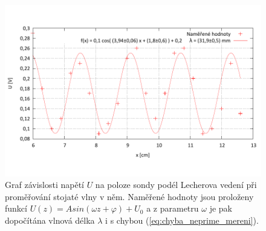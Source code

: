 \documentclass[english]{article}
\begin{document}
	\begin{figure}[h!]
	\begin{center}
	    \vspace*{-1cm}
		\includegraphics[width=\linewidth]{../gnuplot/5_vedeni.pdf}
	    \vspace*{-2cm}
		\caption{Graf závislosti napětí $U$ na poloze sondy podél Lecherova vedení při proměřování stojaté vlny v něm. Naměřené hodnoty jsou proloženy funkcí $U(z) = A sin(\omega z+\varphi)+U_0$ a z parametru $\omega$ je pak dopočítána vlnová délka $\lambda$ i s chybou (\ref{eq:chyba_neprime_mereni}).  }
		\label{fig:g_vedeni}
	\end{center}
	\end{figure}		


\clearpage
\end{document}
